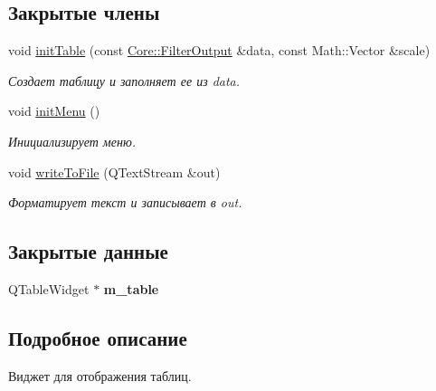\subsection*{Закрытые члены}
\begin{DoxyCompactItemize}
\item 
\hypertarget{class_filter_results_table_a11f5f43cbe98060020a21574be83d37b}{}\label{class_filter_results_table_a11f5f43cbe98060020a21574be83d37b} 
void \hyperlink{class_filter_results_table_a11f5f43cbe98060020a21574be83d37b}{init\+Table} (const \hyperlink{namespace_core_a60877581a235fc9566087b54d463ce9c}{Core\+::\+Filter\+Output} \&data, const Math\+::\+Vector \&scale)
\begin{DoxyCompactList}\small\item\em Создает таблицу и заполняет ее из data. \end{DoxyCompactList}\item 
\hypertarget{class_filter_results_table_aeb9ac72c2a2ab2fd35e54a4b2cf3d191}{}\label{class_filter_results_table_aeb9ac72c2a2ab2fd35e54a4b2cf3d191} 
void \hyperlink{class_filter_results_table_aeb9ac72c2a2ab2fd35e54a4b2cf3d191}{init\+Menu} ()
\begin{DoxyCompactList}\small\item\em Инициализирует меню. \end{DoxyCompactList}\item 
\hypertarget{class_filter_results_table_aa7da6ec37e106e4ce6e9144bfe1c6b38}{}\label{class_filter_results_table_aa7da6ec37e106e4ce6e9144bfe1c6b38} 
void \hyperlink{class_filter_results_table_aa7da6ec37e106e4ce6e9144bfe1c6b38}{write\+To\+File} (Q\+Text\+Stream \&out)
\begin{DoxyCompactList}\small\item\em Форматирует текст и записывает в out. \end{DoxyCompactList}\end{DoxyCompactItemize}
\subsection*{Закрытые данные}
\begin{DoxyCompactItemize}
\item 
\hypertarget{class_filter_results_table_a39dbd713c180f58b87f89f2a9102fa6c}{}\label{class_filter_results_table_a39dbd713c180f58b87f89f2a9102fa6c} 
Q\+Table\+Widget $\ast$ {\bfseries m\+\_\+table}
\end{DoxyCompactItemize}


\subsection{Подробное описание}
Виджет для отображения таблиц. 

